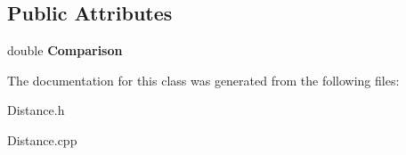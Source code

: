 \subsection*{Public Attributes}
\begin{DoxyCompactItemize}
\item 
\hypertarget{classDistance_adf6dc6f9565c8ce6024af8ae33910993}{}double {\bfseries Comparison}\label{classDistance_adf6dc6f9565c8ce6024af8ae33910993}

\end{DoxyCompactItemize}


The documentation for this class was generated from the following files\+:\begin{DoxyCompactItemize}
\item 
Distance.\+h\item 
Distance.\+cpp\end{DoxyCompactItemize}
